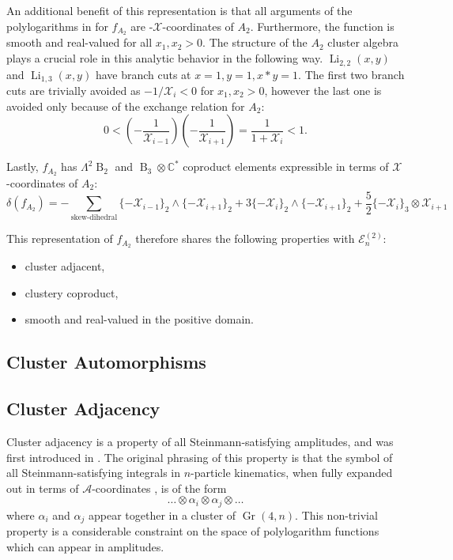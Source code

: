 \documentclass[11pt]{article}
\DeclareMathOperator{\B}{B}
\DeclareMathOperator{\Gr}{Gr}
\DeclareMathOperator{\Li}{Li}
\def\x{\mathcal{X}}
\def\xcoords{$\mathcal{X}$-coordinates }
\def\acoords{$\mathcal{A}$-coordinates }
\begin{document}
An additional benefit of this representation is that all arguments of the polylogarithms in for $f_{A_2}$ are -\xcoords of $A_2$. Furthermore, the function is smooth and real-valued for all $x_1, x_2>0$. The structure of the $A_2$ cluster algebra plays a crucial role in this analytic behavior in the following way. $\Li_{2,2}(x,y)$ and $\Li_{1,3}(x,y)$ have branch cuts at $x=1,y=1, x*y=1$. The first two branch cuts are trivially avoided as $-1/\x_i<0$ for $x_1,x_2>0$, however the last one is avoided only because of the exchange relation for $A_2$: 
\begin{equation}
	0<\left(-\frac{1}{\x_{i-1}}\right)\left(-\frac{1}{\x_{i+1}}\right) = \frac{1}{1+\x_i}<1.
\end{equation}

Lastly, $f_{A_2}$ has $\Lambda^2\B_2$ and $\B_3 \otimes \mathbb{C}^*$ coproduct elements expressible in terms of \xcoords of $A_2$:
\begin{equation}
	\delta\left(f_{A_2}\right) = -\sum_{\text{skew-dihedral}} \{-\x_{i-1}\}_2 \wedge \{-\x_{i+1}\}_2 + 3\{-\x_{i}\}_2 \wedge \{-\x_{i+1}\}_2 + \frac{5}{2}\{-\x_{i}\}_3 \otimes \x_{i+1}
\end{equation}

This representation of $f_{A_2}$ therefore shares the following properties with $\mathcal{E}^{(2)}_n$:
\begin{itemize}
	\item cluster adjacent,
	\item clustery coproduct,
	\item smooth and real-valued in the positive domain.
\end{itemize}


\subsection{Cluster Automorphisms}

\subsection{Cluster Adjacency}

Cluster adjacency is a property of all Steinmann-satisfying amplitudes, and was first introduced in \cite{Drummond:2017ssj}. The original phrasing of this property is that the symbol of all Steinmann-satisfying integrals in $n$-particle kinematics, when fully expanded out in terms of \acoords, is of the form 
\begin{equation}
	\ldots \otimes \alpha_i \otimes \alpha_j\otimes \ldots 
\end{equation}
where $\alpha_i$ and $\alpha_j$ appear together in a cluster of $\Gr(4,n)$. This non-trivial property is a considerable constraint on the space of polylogarithm functions which can appear in amplitudes. 
\end{document}
